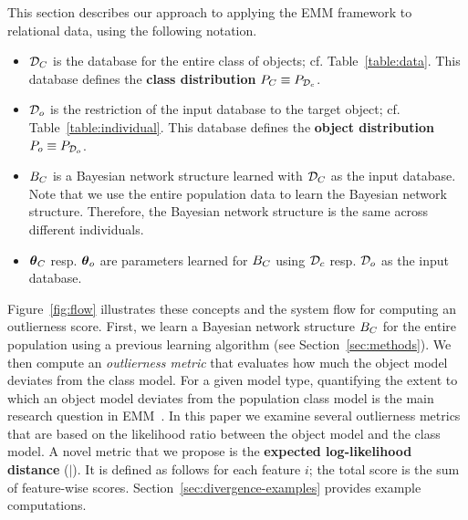 {This section describes our approach to applying the EMM framework to relational data, using the following notation.
%
\begin{itemize}
	\item $\mathcal{D}_{C}$ is the database for the entire class of objects; cf. Table~\ref{table:data}. This database defines the \textbf{class distribution} $P_{C} \equiv P_{\mathcal{D}_{c}}$.
	\item $\mathcal{D}_{o}$ is the restriction of the input database to the target object; cf. Table~\ref{table:individual}. This database defines the \textbf{object distribution} $P_{o} \equiv P_{\mathcal{D}_{o}}$.
	\item $B_{C}$ is a Bayesian network structure learned with $\mathcal{D}_{C}$ as the input database. Note that we use the entire population data to learn the Bayesian network structure. Therefore, the Bayesian network structure is the same across different individuals.
	\item $\boldsymbol{\theta}_{C}$ resp. $\boldsymbol{\theta}_{o}$ are parameters learned for $B_{C}$ using $\mathcal{D}_{c}$ resp. $\mathcal{D}_{o}$ as the input database.
\end{itemize}

Figure~\ref{fig:flow} illustrates these concepts and the system flow for computing an outlierness score. First, we learn a Bayesian network structure $B_{C}$ for the entire population using a previous learning algorithm (see Section~\ref{sec:methods}). We then compute an {\em outlierness metric} that evaluates how much the object model deviates from the class model. 
%
%
For a given model type, quantifying the extent to which an object model deviates from the population class model is the main research question in EMM~\citep{Duivesteijn2016}. In this paper we examine several outlierness metrics that are based on the likelihood ratio between the object model and the class model. 
A novel metric that we propose is the \textbf{expected log-likelihood distance} ($\mid$). It is defined as follows for each feature $i$; the total score is the sum of feature-wise scores. Section~\ref{sec:divergence-examples}  provides example computations.


}
